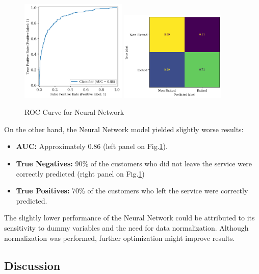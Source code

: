 \documentclass[12pt]{article}
\begin{document}
\begin{figure}[h!]
    \centering
    \includegraphics[width=0.45\textwidth]{figures/roc_curve_nn.png}
    \includegraphics[width=0.45\textwidth]{figures/confusion_matrix_nn.png}
    \caption{ROC Curve for Neural Network}
    \label{fig:roc_curve_nn}
\end{figure}

On the other hand, the Neural Network model yielded slightly worse results:
\begin{itemize}
    \item \textbf{AUC:} Approximately 0.86 (left panel on Fig.\ref{fig:roc_curve_nn}).
    \item \textbf{True Negatives:} 90\% of the customers who did not leave the service were correctly predicted (right panel on Fig.\ref{fig:roc_curve_nn})
    \item \textbf{True Positives:} 70\% of the customers who left the service were correctly predicted.
\end{itemize}

The slightly lower performance of the Neural Network could be attributed to its sensitivity to dummy variables and the need for data normalization. Although normalization was performed, further optimization might improve results.

\subsection{Discussion}
\end{document}
